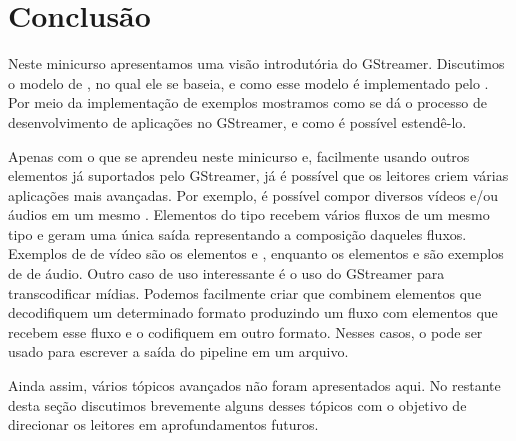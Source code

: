 \section{Conclusão}
\label{sec:conclusao}
Neste minicurso apresentamos uma visão introdutória do 
GStreamer.  Discutimos o modelo de , no qual ele se baseia, e como
esse modelo é implementado pelo .  Por meio da implementação de
exemplos mostramos como se dá o processo de desenvolvimento de aplicações no
GStreamer, e como é possível estendê-lo. 

Apenas com o que se aprendeu neste minicurso e, facilmente usando outros
elementos já suportados pelo GStreamer, já é possível que os leitores criem
várias aplicações mais avançadas.  Por exemplo, é possível compor diversos
vídeos e/ou áudios em um mesmo .  Elementos do tipo 
recebem vários fluxos de um mesmo tipo e geram uma única saída representando a
composição daqueles fluxos. Exemplos de  de vídeo são os elementos
 e , enquanto os elementos  e
 são exemplos de  de áudio.  Outro caso de uso
interessante é o uso do GStreamer para transcodificar mídias.  Podemos
facilmente criar  que combinem elementos que decodifiquem um
determinado formato produzindo um fluxo  com elementos que recebem esse
fluxo  e o codifiquem em outro formato.  Nesses casos, o 
 pode ser usado para escrever a saída do pipeline em um arquivo.

Ainda assim, vários tópicos avançados não foram apresentados aqui.  No restante
desta seção discutimos brevemente alguns desses tópicos com o objetivo de
direcionar os leitores em aprofundamentos futuros.

